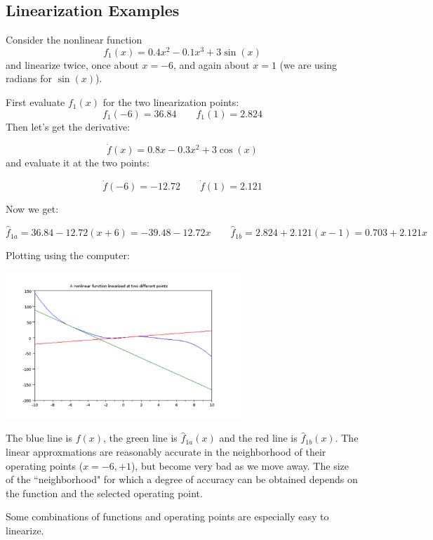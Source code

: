 \subsection{Linearization Examples}
\begin{ExampleSmall}\label{twolinexamples}

Consider the nonlinear function
\[
f_1(x) = 0.4x^2 -0.1x^3 + 3\sin(x)
\]
and linearize twice, once about $x=-6$, and again about $x=1$ (we are using radians for $\sin(x)$).

\vspace{0.2in}

First evaluate $f_1(x)$ for the two linearization points:
\[
f_1(-6) = 36.84 \qquad  f_1(1) = 2.824
\]
Then let's get the derivative:

\[
\dot{f}(x) = 0.8x -0.3x^2 +3\cos(x)
\]
and evaluate it at the two points:

\[
\dot{f}(-6) = -12.72 \qquad \dot{f}(1) = 2.121
\]

Now we get:

\[
\hat{f}_{1a} = 36.84-12.72(x+6) = -39.48-12.72x \qquad \hat{f}_{1b} = 2.824+2.121(x-1) = 0.703+2.121x
\]

Plotting using the computer:
\begin{center}
\includegraphics[width=3.5in]{figs01/linearizeattwopointsa.png}
\end{center}

The blue line is $f(x)$, the green line is $\hat{f}_{1a}(x)$ and the red line is $\hat{f}_{1b}(x)$.  The linear approxmations are reasonably accurate in the neighborhood of their operating points ($x = -6, +1$), but become very bad as we move away.  The size of the ``neighborhood" for which a degree of accuracy can be obtained depends on the function and the selected operating point.

\end{ExampleSmall}


Some combinations of functions and operating points are especially easy to linearize.

